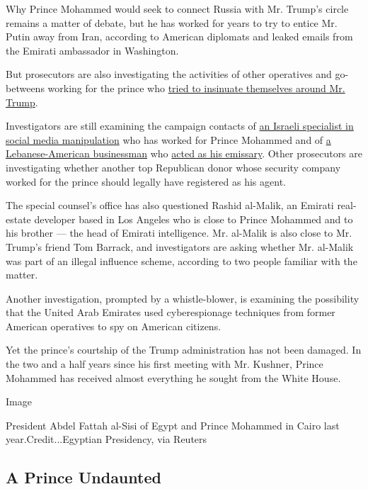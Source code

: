 Why Prince Mohammed would seek to connect Russia with Mr. Trump's circle
remains a matter of debate, but he has worked for years to try to entice
Mr. Putin away from Iran, according to American diplomats and leaked
emails from the Emirati ambassador in Washington.

But prosecutors are also investigating the activities of other
operatives and go-betweens working for the prince who
\href{https://www.nytimes.com/2018/05/19/us/politics/trump-jr-saudi-uae-nader-prince-zamel.html}{tried
to insinuate themselves around Mr. Trump}.

Investigators are still examining the campaign contacts of
\href{https://www.nytimes.com/2018/10/08/us/politics/rick-gates-psy-group-trump.html}{an
Israeli specialist in social media manipulation} who has worked for
Prince Mohammed and of
\href{https://www.nytimes.com/2018/04/04/us/politics/george-nader-russia-uae-special-counsel-investigation.html}{a
Lebanese-American businessman} who
\href{https://www.nytimes.com/2018/03/21/us/politics/george-nader-elliott-broidy-uae-saudi-arabia-white-house-influence.html}{acted
as his emissary}. Other prosecutors are investigating whether another
top Republican donor whose security company worked for the prince should
legally have registered as his agent.

The special counsel's office has also questioned Rashid al-Malik, an
Emirati real-estate developer based in Los Angeles who is close to
Prince Mohammed and to his brother --- the head of Emirati intelligence.
Mr. al-Malik is also close to Mr. Trump's friend Tom Barrack, and
investigators are asking whether Mr. al-Malik was part of an illegal
influence scheme, according to two people familiar with the matter.

Another investigation, prompted by a whistle-blower, is examining the
possibility that the United Arab Emirates used cyberespionage techniques
from former American operatives to spy on American citizens.

Yet the prince's courtship of the Trump administration has not been
damaged. In the two and a half years since his first meeting with Mr.
Kushner, Prince Mohammed has received almost everything he sought from
the White House.

Image

President Abdel Fattah al-Sisi of Egypt and Prince Mohammed in Cairo
last year.Credit...Egyptian Presidency, via Reuters

\hypertarget{a-prince-undaunted}{%
\subsection{A Prince Undaunted}\label{a-prince-undaunted}}

